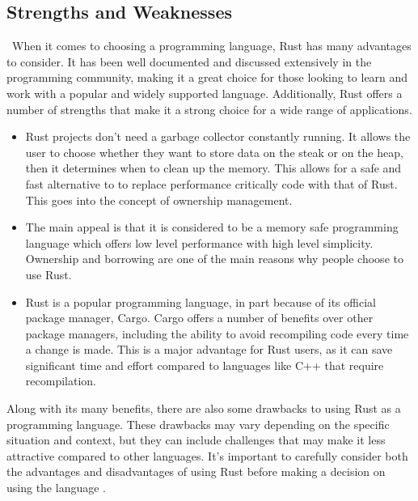 \documentclass{article}
\theoremstyle{theorem}
\theoremstyle{definition}
\theoremstyle{remark}
\begin{document}
\subsection{Strengths and Weaknesses}\
When it comes to choosing a programming language, Rust has many advantages to consider. It has been well documented and discussed extensively in the programming community, making it a great choice for those looking to learn and work with a popular and widely supported language. Additionally, Rust offers a number of strengths that make it a strong choice for a wide range of applications.
\begin{itemize}
\item Rust projects don’t need a garbage collector constantly running. It allows the user to choose whether they want to store data on the steak or on the heap, then it determines when to clean up the memory. This allows for a safe and fast alternative to to replace performance critically code with that of Rust. This goes into the concept of ownership management. \cite{WIR}
\item The main appeal is that it is considered to be a memory safe programming language which offers low level performance with high level simplicity. Ownership and borrowing are one of the main reasons why people choose to use Rust.
\item Rust is a popular programming language, in part because of its official package manager, Cargo. Cargo offers a number of benefits over other package managers, including the ability to avoid recompiling code every time a change is made. This is a major advantage for Rust users, as it can save significant time and effort compared to languages like C++ that require recompilation. 
\end{itemize}
Along with its many benefits, there are also some drawbacks to using Rust as a programming language. These drawbacks may vary depending on the specific situation and context, but they can include challenges that may make it less attractive compared to other languages. It's important to carefully consider both the advantages and disadvantages of using Rust before making a decision on using the language \cite{SOD}.
\end{document}
